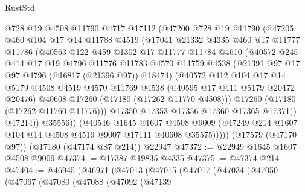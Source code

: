 \begin{lexlean}{RustStd}
\begin{coremodule}
              @728
              @19
              @4508
              @11790
              @4717
              @17112
              (@47200
                @728
                @19
                @11790
                (@47205
                  @460
                  @104
                  @17
                  @14
                  @11788
                  @4519
                  (@17041
                    @21332
                    @4335
                    @460
                    @17
                    @11777
                    @11786
                    (@40563
                      @122
                      @459
                      @1302
                      @17
                      @11777
                      @11784
                      @4610
                      (@40572
                        @245
                        @414
                        @17
                        @19
                        @4796
                        @11776
                        @11783
                        @4570
                        @11759
                        @4538
                        (@21391 @97 @17 @97 @4796 (@16817 (@21396 @97)) @18474)
                        (@40572
                          @412
                          @104
                          @17
                          @14
                          @5179
                          @4508
                          @4519
                          @4570
                          @11769
                          @4538
                          (@40595 @17 @411 @5179 @20472 @20476)
                          @40608
                          @17260
                          (@17180 (@17262 @11770 @4508)))
                        @17260
                        (@17180 (@17262 @11760 @11776)))
                      @17350
                      @17353
                      @17356
                      @17360
                      @17365
                      @17371))
                  @47214))
              @35556))
          (@40546
            @1645
            @1607
            @4508
            @9009
            (@47249 @214 @1607 @104 @14 @4508 @4519 @9007 @17111 @40608 @35575)))))
    (@17579 (@47170 @97))
    (@17180 (@47174 @87 @214))
    @22947
@47372 := @22949 @1645 @1607 @4508 @9009
@47374 := @17387 @19835 @4335
@47375 := @47374 @214
@47404 := @46945
    (@46971
      (@47013
        (@47015
          (@47017
            (@47034
              (@47050
                (@47067
                  (@47080
                    (@47088
                      (@47092
                        (@47139

\end{coremodule}
\end{lexlean}
